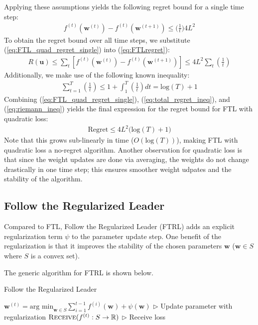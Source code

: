 \documentclass[11pt]{article}
\begin{document}
Applying these assumptions yields the following regret bound for a single time step:
\begin{align}
    f^{(t)}(\boldsymbol{w}^{(t)}) - f^{(t)}(\boldsymbol{w}^{(t+1)}) \leq \Big( \frac{1}{t} \Big) 4L^2
    \label{eq:FTL_quad_regret_single}
\end{align}
To obtain the regret bound over all time steps, we substitute (\ref{eq:FTL_quad_regret_single}) into (\ref{eq:FTLregret}):
\begin{align}
    R(\boldsymbol{u}) \leq \sum_t [f^{(t)}(\boldsymbol{w}^{(t)})-f^{(t)} (\boldsymbol{w}^{(t+1)})] \leq 4L^2\sum_t (\frac{1}{t})
    \label{eq:total_regret_ineq}
\end{align}
Additionally, we make use of the following known inequality:
\begin{align}
    \sum_{t=1}^T(\frac{1}{t}) \leq 1 + \int_1^T (\frac{1}{t}) dt = \text{log}(T) + 1
    \label{eq:riemann_ineq}
\end{align}
Combining (\ref{eq:FTL_quad_regret_single}), (\ref{eq:total_regret_ineq}), and (\ref{eq:riemann_ineq}) yields the final expression for the regret bound for FTL with quadratic loss:
\begin{align}
    \text{Regret} \leq 4L^2 \Big( \text{log}(T) + 1 \Big)
\end{align}
Note that this grows sub-linearly in time ($O(\text{log}(T))$), making FTL with quadratic loss a no-regret algorithm. Another observation for quadratic loss is that since the weight updates are done via averaging, the weights do not change drastically in one time step; this ensures smoother weight udpates and the stability of the algorithm.

\normalfont


\subsection{Follow the Regularized Leader}
Compared to FTL, Follow the Regularized Leader (FTRL) adds an explicit regularization term $\psi$ to the parameter update step. One benefit of the regularization is that it improves the stability of the chosen parameters $\boldsymbol{w}$ ($\boldsymbol{w}\in S$ where $S$ is a convex set).

The generic algorithm for FTRL is shown below.

\begin{algorithm}[H]
\caption{Follow the Regularized Leader}
\label{algo:FTRL}
\begin{algorithmic}[1]
\vspace{5pt}
\STATE \qquad  $\boldsymbol{w}^{(t)}=\text{arg min}_{\boldsymbol{w}\in S} \sum_{i=1}^{t-1} f^{(i)} (\boldsymbol{w}) + \psi (\boldsymbol{w})$
\vspace{5pt} \hfill $\triangleright$ Update parameter with regularization
\STATE \qquad  $\textsc{Receive}(f^{(t)}:S \rightarrow \mathbb{R})$ \hfill $\triangleright$ Receive loss
\ENDFOR
\end{algorithmic}
\end{algorithm}
\end{document}
